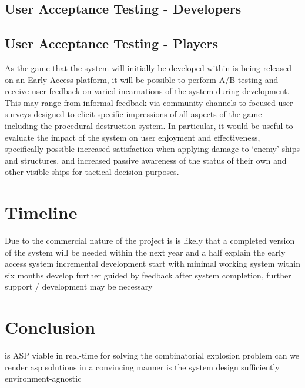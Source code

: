 \documentclass[11pt]{report}
\begin{document}
	\section{User Acceptance Testing - Developers}

	\section{User Acceptance Testing - Players}
		As the game that the system will initially be developed within is being released on an Early Access platform, it will be possible to perform A/B testing and receive user feedback on varied incarnations of the system during development. This may range from informal feedback via community channels to focused user surveys designed to elicit specific impressions of all aspects of the game --- including the procedural destruction system. In particular, it would be useful to evaluate the impact of the system on user enjoyment and effectiveness, specifically possible increased satisfaction when applying damage to `enemy' ships and structures, and increased passive awareness of the status of their own and other visible ships for tactical decision purposes.
\chapter{Timeline}
	Due to the commercial nature of the project is is likely that a completed version of the system will be needed within the next year and a half
	explain the early access system
	incremental development
	start with minimal working system within six months
	develop further guided by feedback
	after system completion, further support / development may be necessary

\chapter{Conclusion}
	is ASP viable in real-time for solving the combinatorial explosion problem
	can we render asp solutions in a convincing manner
	is the system design sufficiently environment-agnostic





\end{document}
